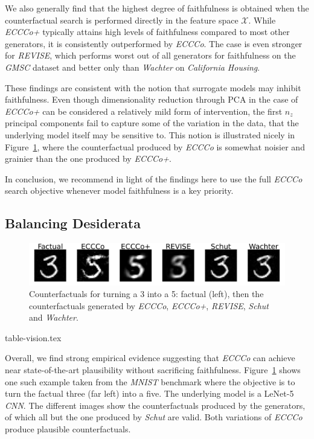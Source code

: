 We also generally find that the highest degree of faithfulness is obtained when the counterfactual search is performed directly in the feature space $\mathcal{X}$. While \textit{ECCCo+} typically attains high levels of faithfulness compared to most other generators, it is consistently outperformed by \textit{ECCCo}. The case is even stronger for \textit{REVISE}, which performs worst out of all generators for faithfulness on the \textit{GMSC} dataset and better only than \textit{Wachter} on \textit{California Housing}. 

These findings are consistent with the notion that surrogate models may inhibit faithfulness. Even though dimensionality reduction through PCA in the case of \textit{ECCCo+} can be considered a relatively mild form of intervention, the first $n_z$ principal components fail to capture some of the variation in the data, that the underlying model itself may be sensitive to. This notion is illustrated nicely in Figure~\ref{fig:mnist-bmk}, where the counterfactual produced by \textit{ECCCo} is somewhat noisier and grainier than the one produced by \textit{ECCCo+}. 

In conclusion, we recommend in light of the findings here to use the full \textit{ECCCo} search objective whenever model faithfulness is a key priority. 

\subsection{Balancing Desiderata}

\begin{figure}
  \centering
  \includegraphics[width=1.0\linewidth]{../www/mnist_benchmark.png}
  \caption{Counterfactuals for turning a 3 into a 5: factual (left), then the counterfactuals generated by \textit{ECCCo}, \textit{ECCCo+}, \textit{REVISE}, \textit{Schut} and \textit{Wachter}.}\label{fig:mnist-bmk}
\end{figure}


{table-vision.tex}

Overall, we find strong empirical evidence suggesting that \textit{ECCCo} can achieve near state-of-the-art plausibility without sacrificing faithfulness. Figure~\ref{fig:mnist-bmk} shows one such example taken from the \textit{MNIST} benchmark where the objective is to turn the factual three (far left) into a five. The underlying model is a LeNet-5 \textit{CNN}. The different images show the counterfactuals produced by the generators, of which all but the one produced by \textit{Schut} are valid. Both variations of \textit{ECCCo} produce plausible counterfactuals.


